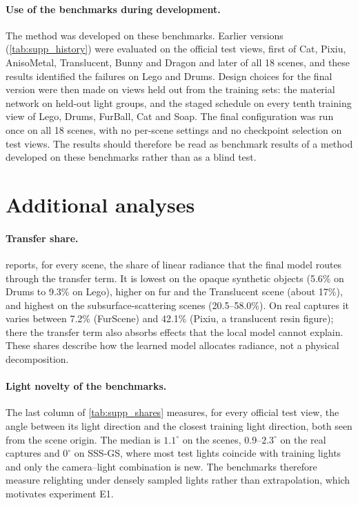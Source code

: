 \documentclass[10pt,twocolumn,letterpaper]{article}
\begin{document}
\paragraph{Use of the benchmarks during development.}
The method was developed on these benchmarks.
Earlier versions (\cref{tab:supp_history}) were evaluated on the official test views, first of Cat, Pixiu, AnisoMetal, Translucent, Bunny and Dragon and later of all 18 scenes, and these results identified the failures on Lego and Drums.
Design choices for the final version were then made on views held out from the training sets: the material network on held-out light groups, and the staged schedule on every tenth training view of Lego, Drums, FurBall, Cat and Soap.
The final configuration was run once on all 18 scenes, with no per-scene settings and no checkpoint selection on test views.
The results should therefore be read as benchmark results of a method developed on these benchmarks rather than as a blind test.



\section{Additional analyses}
\label{sec:s_analysis}

\paragraph{Transfer share.}
 reports, for every scene, the share of linear radiance that the final model routes through the transfer term.
It is lowest on the opaque synthetic objects (5.6\% on Drums to 9.3\% on Lego), higher on fur and the Translucent scene (about 17\%), and highest on the subsurface-scattering scenes (20.5--58.0\%).
On real captures it varies between 7.2\% (FurScene) and 42.1\% (Pixiu, a translucent resin figure); there the transfer term also absorbs effects that the local model cannot explain.
These shares describe how the learned model allocates radiance, not a physical decomposition.



\paragraph{Light novelty of the benchmarks.}
The last column of \cref{tab:supp_shares} measures, for every official test view, the angle between its light direction and the closest training light direction, both seen from the scene origin.
The median is $1.1^\circ$ on the \gsthree scenes, 0.9--$2.3^\circ$ on the real captures and $0^\circ$ on SSS-GS, where most test lights coincide with training lights and only the camera--light combination is new.
The benchmarks therefore measure relighting under densely sampled lights rather than extrapolation, which motivates experiment E1.
\end{document}
